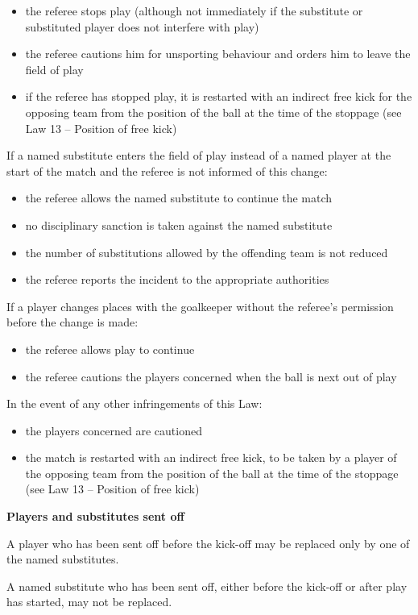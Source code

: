 \begin{itemize}
\item the referee stops play (although not immediately if the substitute or substituted player does not interfere with play)
\item the referee cautions him for unsporting behaviour and orders him to leave the field of play 
\item if the referee has stopped play, it is restarted with an indirect free kick for the opposing team from the position of the ball at the time of the stoppage (see Law 13 -- Position of free kick)
\end{itemize}

\bigskip

If a named substitute enters the field of play instead of a named player at the start of the match and the referee is not informed of this change:

\begin{itemize}
\item the referee allows the named substitute to continue the match 
\item no disciplinary sanction is taken against the named substitute 
\item the number of substitutions allowed by the offending team is not reduced 
\item the referee reports the incident to the appropriate authorities
\end{itemize}

\bigskip

If a player changes places with the goalkeeper without the
referee's permission before the change is made: 

\begin{itemize}
\item the referee allows play to continue
\item the referee cautions the players concerned when the ball is next out of play
\end{itemize}

\bigskip

In the event of any other infringements of this Law:

\begin{itemize}
\item the players concerned are cautioned
\item the match is restarted with an indirect free kick, to be taken by a player of the opposing team from the position of the ball at the time of the stoppage (see Law 13 -- Position of free kick)
\end{itemize}

\bigskip

{\bfseries Players and substitutes sent off}

\headlinebox

A player who has been sent off before the kick-off may be replaced only by one of the named substitutes.

\bigskip

A named substitute who has been sent off, either before the kick-off or after play has started, may not be replaced.